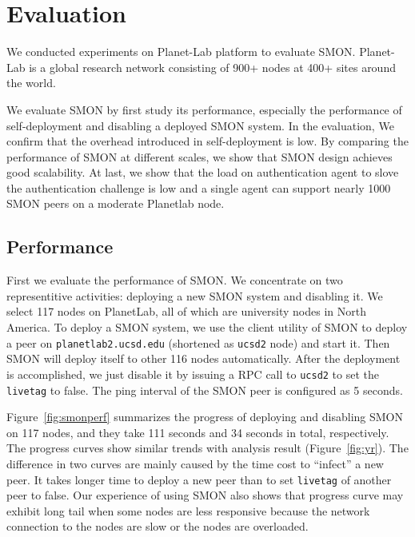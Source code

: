 \section{Evaluation}
\label{sec:eval}

We conducted experiments on Planet-Lab platform to evaluate
SMON. Planet-Lab is a global research network consisting of
900+ nodes at 400+ sites around the world.

We evaluate SMON by first study its performance, especially
the performance of self-deployment and disabling a deployed
SMON system. In the evaluation, We confirm that the overhead
introduced in self-deployment is low. By comparing the
performance of SMON at different scales, we show that SMON
design achieves good scalability. At last, we show that the
load on authentication agent to slove the authentication
challenge is low and a single agent can support nearly 1000
SMON peers on a moderate Planetlab node.

%

\subsection{Performance}

First we evaluate the performance of SMON. We concentrate on
two representitive activities: deploying a new SMON system
and disabling it. We select 117 nodes on PlanetLab, all of
which are university nodes in North America. To deploy a
SMON system, we use the client utility of SMON to deploy a
peer on \texttt{planet\-lab2.ucsd.edu} (shortened as
\texttt{ucsd2} node) and start it. Then SMON will deploy
itself to other 116 nodes automatically. After the
deployment is accomplished, we just disable it by issuing a
RPC call to \texttt{ucsd2} to set the \texttt{livetag} to
false.  The ping interval of the SMON peer is configured as
5 seconds.

Figure~\ref{fig:smonperf} summarizes the progress of
deploying and disabling SMON on 117 nodes, and they take
111 seconds and 34 seconds in total, respectively. The
progress curves show similar trends with analysis result
(Figure~\ref{fig:yr}). The difference in two curves are
mainly caused by the time cost to ``infect'' a new peer. It
takes longer time to deploy a new peer than to set
\texttt{livetag} of another peer to false. Our experience
of using SMON also shows that progress curve may exhibit
long tail when some nodes are less responsive because the
network connection to the nodes are slow or the nodes are
overloaded.

